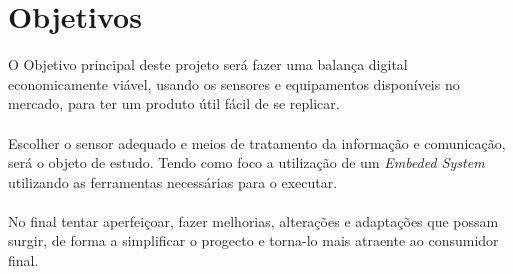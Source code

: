 \section{Objetivos}
O Objetivo principal deste projeto será fazer uma balança digital economicamente viável, usando os sensores e equipamentos disponíveis no mercado, para ter um produto útil fácil de se replicar.
\\
\\
Escolher o sensor adequado e meios de tratamento da informação e comunicação, será o objeto de estudo. Tendo como foco a utilização de um \textit{Embeded System} utilizando as ferramentas necessárias para o executar.
\\
\\
No final tentar aperfeiçoar, fazer melhorias, alterações e adaptações que possam surgir, de forma a simplificar o progecto e torna-lo mais atraente ao consumidor final.
\newpage
